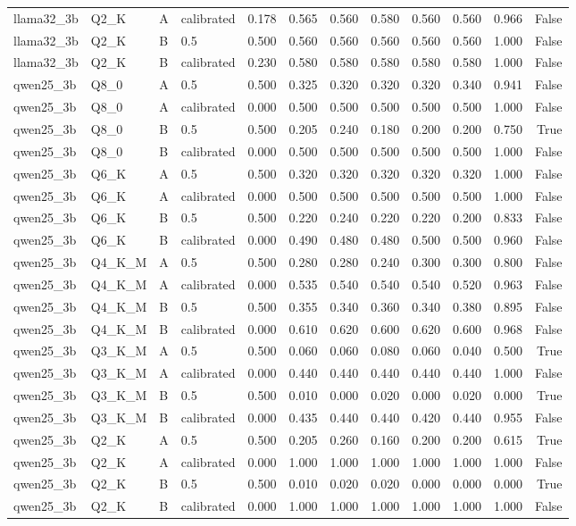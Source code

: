 \begin{tabular}{llllrrrrrrrr}
llama32\_3b & Q2\_K & A & calibrated & 0.178 & 0.565 & 0.560 & 0.580 & 0.560 & 0.560 & 0.966 & False \\
llama32\_3b & Q2\_K & B & 0.5 & 0.500 & 0.560 & 0.560 & 0.560 & 0.560 & 0.560 & 1.000 & False \\
llama32\_3b & Q2\_K & B & calibrated & 0.230 & 0.580 & 0.580 & 0.580 & 0.580 & 0.580 & 1.000 & False \\
qwen25\_3b & Q8\_0 & A & 0.5 & 0.500 & 0.325 & 0.320 & 0.320 & 0.320 & 0.340 & 0.941 & False \\
qwen25\_3b & Q8\_0 & A & calibrated & 0.000 & 0.500 & 0.500 & 0.500 & 0.500 & 0.500 & 1.000 & False \\
qwen25\_3b & Q8\_0 & B & 0.5 & 0.500 & 0.205 & 0.240 & 0.180 & 0.200 & 0.200 & 0.750 & True \\
qwen25\_3b & Q8\_0 & B & calibrated & 0.000 & 0.500 & 0.500 & 0.500 & 0.500 & 0.500 & 1.000 & False \\
qwen25\_3b & Q6\_K & A & 0.5 & 0.500 & 0.320 & 0.320 & 0.320 & 0.320 & 0.320 & 1.000 & False \\
qwen25\_3b & Q6\_K & A & calibrated & 0.000 & 0.500 & 0.500 & 0.500 & 0.500 & 0.500 & 1.000 & False \\
qwen25\_3b & Q6\_K & B & 0.5 & 0.500 & 0.220 & 0.240 & 0.220 & 0.220 & 0.200 & 0.833 & False \\
qwen25\_3b & Q6\_K & B & calibrated & 0.000 & 0.490 & 0.480 & 0.480 & 0.500 & 0.500 & 0.960 & False \\
qwen25\_3b & Q4\_K\_M & A & 0.5 & 0.500 & 0.280 & 0.280 & 0.240 & 0.300 & 0.300 & 0.800 & False \\
qwen25\_3b & Q4\_K\_M & A & calibrated & 0.000 & 0.535 & 0.540 & 0.540 & 0.540 & 0.520 & 0.963 & False \\
qwen25\_3b & Q4\_K\_M & B & 0.5 & 0.500 & 0.355 & 0.340 & 0.360 & 0.340 & 0.380 & 0.895 & False \\
qwen25\_3b & Q4\_K\_M & B & calibrated & 0.000 & 0.610 & 0.620 & 0.600 & 0.620 & 0.600 & 0.968 & False \\
qwen25\_3b & Q3\_K\_M & A & 0.5 & 0.500 & 0.060 & 0.060 & 0.080 & 0.060 & 0.040 & 0.500 & True \\
qwen25\_3b & Q3\_K\_M & A & calibrated & 0.000 & 0.440 & 0.440 & 0.440 & 0.440 & 0.440 & 1.000 & False \\
qwen25\_3b & Q3\_K\_M & B & 0.5 & 0.500 & 0.010 & 0.000 & 0.020 & 0.000 & 0.020 & 0.000 & True \\
qwen25\_3b & Q3\_K\_M & B & calibrated & 0.000 & 0.435 & 0.440 & 0.440 & 0.420 & 0.440 & 0.955 & False \\
qwen25\_3b & Q2\_K & A & 0.5 & 0.500 & 0.205 & 0.260 & 0.160 & 0.200 & 0.200 & 0.615 & True \\
qwen25\_3b & Q2\_K & A & calibrated & 0.000 & 1.000 & 1.000 & 1.000 & 1.000 & 1.000 & 1.000 & False \\
qwen25\_3b & Q2\_K & B & 0.5 & 0.500 & 0.010 & 0.020 & 0.020 & 0.000 & 0.000 & 0.000 & True \\
qwen25\_3b & Q2\_K & B & calibrated & 0.000 & 1.000 & 1.000 & 1.000 & 1.000 & 1.000 & 1.000 & False \\
\bottomrule
\end{tabular}
